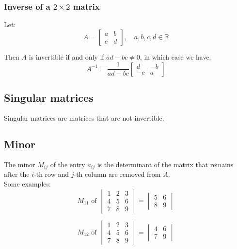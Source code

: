 \documentclass[11pt]{article}
\begin{document}
\subsubsection{Inverse of a \(2 \times 2\) matrix}
\label{sec:org3876812}
Let:
\begin{displaymath}
A = \begin{bmatrix}
a & b \\
c & d
\end{bmatrix}, \quad a, b, c, d \in \mathbb{R}
\end{displaymath}

Then \(A\) is invertible if and only if \(ad - bc \neq 0\), in which case we have:
\begin{displaymath}
A^{-1} = \frac{1}{ad - bc} \begin{bmatrix}
d & -b \\
-c & a
\end{bmatrix}
\end{displaymath}

 \newpage

\subsection{Singular matrices}
\label{sec:org1399555}
Singular matrices are matrices that are not invertible.

\subsection{Minor}
\label{sec:org6f3a1a5}
The minor \(M_{ij}\) of the entry \(a_{ij}\) is the determinant of the matrix that remains after the \(i\)-th row and \(j\)-th column are removed from \(A\).
\\[0pt]

Some examples:
\begin{displaymath}
M_{11} \text{ of }
\begin{vmatrix}
1 & 2 & 3 \\
4 & 5 & 6 \\
7 & 8 & 9
\end{vmatrix} = \begin{vmatrix}
5 & 6 \\
8 & 9
\end{vmatrix}
\end{displaymath}

\begin{displaymath}
M_{12} \text{ of }
\begin{vmatrix}
1 & 2 & 3 \\
4 & 5 & 6 \\
7 & 8 & 9
\end{vmatrix} = \begin{vmatrix}
4 & 6 \\
7 & 9
\end{vmatrix}
\end{displaymath}
\end{document}
